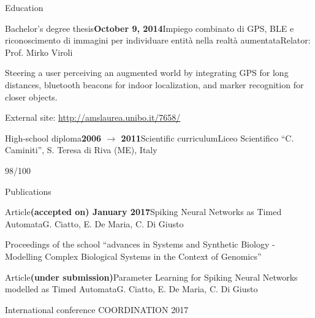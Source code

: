 \documentclass{resume} %
\begin{document}
\begin{rSection}{Education}
\begin{rSubsection}{Bachelor's degree thesis}{\textbf{October 9, 2014}}{Impiego combinato di GPS, BLE e riconoscimento di immagini per individuare entità nella realtà aumentata}{Relator: Prof. Mirko Viroli}
	
	\item Steering a user perceiving an augmented world by integrating GPS for long distances, bluetooth beacons for indoor localization, and marker recognition for closer objects.
	
	\item External site: \url{http://amslaurea.unibo.it/7658/}
\end{rSubsection}

\begin{rSubsection}{High-school diploma}{\textbf{2006 $\rightarrow$ 2011}}{Scientific curriculum}{Liceo Scientifico ``C. Caminiti'', S. Teresa di Riva (ME), Italy}
	\item 98/100
\end{rSubsection}

\end{rSection}


\begin{rSection}{Publications}

\begin{rSubsection}{Article}{\textbf{(accepted on) January 2017}}{Spiking Neural Networks as Timed Automata}{G. Ciatto, E. De Maria, C. Di Giusto}
	\item Proceedings of the school ``advances in Systems and Synthetic Biology - Modelling Complex Biological Systems in the Context of Genomics''
\end{rSubsection}

\begin{rSubsection}{Article}{\textbf{(under submission)}}{Parameter Learning for Spiking Neural Networks modelled as Timed Automata}{G. Ciatto, E. De Maria, C. Di Giusto}
	\item International conference COORDINATION 2017
\end{rSubsection}

\end{rSection}

\end{document}
